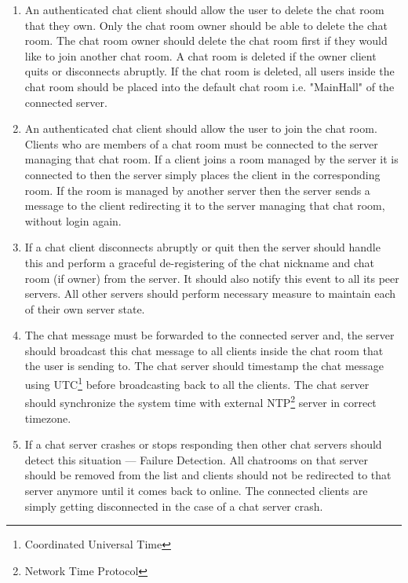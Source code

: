 \documentclass[dareport.tex]{subfiles}
\begin{document}
\begin{enumerate}[leftmargin=*]
\item An authenticated chat client should allow the user to delete the chat room that they own. Only the chat room owner should be able to delete the chat room. The chat room owner should delete the chat room first if they would like to join another chat room. A chat room is deleted if the owner client quits or disconnects abruptly. If the chat room is deleted, all users inside the chat room should be placed into the default chat room i.e. "MainHall" of the connected server.

\item An authenticated chat client should allow the user to join the chat room. Clients who are members of a chat room must be connected to the server managing that chat room. If a client joins a room managed by the server it is connected to then the server simply places the client in the corresponding room. If the room is managed by another server then the server sends a message to the client redirecting it to the server managing that chat room, without login again.

\item If a chat client disconnects abruptly or quit then the server should handle this and perform a graceful de-registering of the chat nickname and chat room (if owner) from the server. It should also notify this event to all its peer servers. All other servers should perform necessary measure to maintain each of their own server state.

\item The chat message must be forwarded to the connected server and, the server should broadcast this chat message to all clients inside the chat room that the user is sending to. The chat server should timestamp the chat message using UTC\footnote{Coordinated Universal Time} before broadcasting back to all the clients. The chat server should synchronize the system time with external NTP\footnote{Network Time Protocol} server in correct timezone.

\item If a chat server crashes or stops responding then other chat servers should detect this situation --- Failure Detection. All chatrooms on that server should be removed from the list and clients should not be redirected to that server anymore until it comes back to online. The connected clients are simply getting disconnected in the case of a chat server crash.

\end{enumerate}
\end{document}
